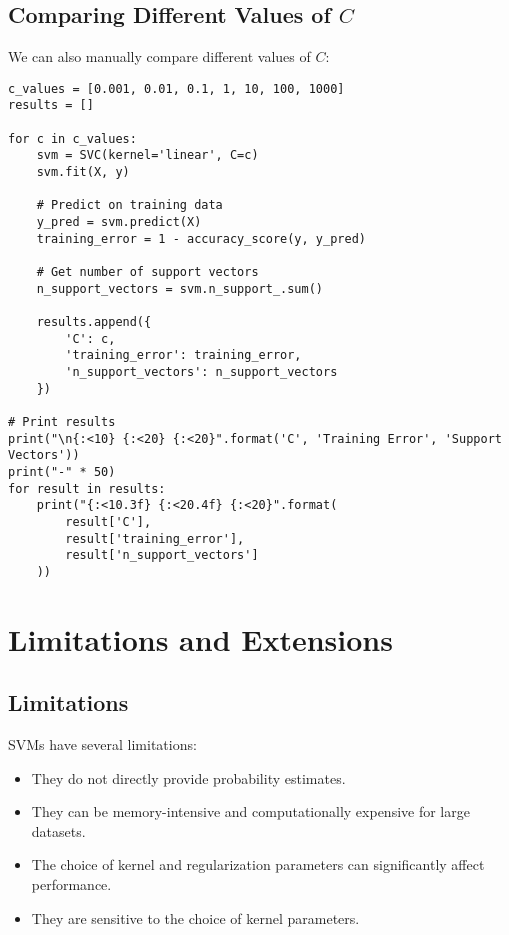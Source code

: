 \documentclass{article}
\begin{document}
\subsection{Comparing Different Values of $C$}

We can also manually compare different values of $C$:

\begin{lstlisting}[caption=Comparing Different Values of C]
c_values = [0.001, 0.01, 0.1, 1, 10, 100, 1000]
results = []

for c in c_values:
    svm = SVC(kernel='linear', C=c)
    svm.fit(X, y)
    
    # Predict on training data
    y_pred = svm.predict(X)
    training_error = 1 - accuracy_score(y, y_pred)
    
    # Get number of support vectors
    n_support_vectors = svm.n_support_.sum()
    
    results.append({
        'C': c,
        'training_error': training_error,
        'n_support_vectors': n_support_vectors
    })

# Print results
print("\n{:<10} {:<20} {:<20}".format('C', 'Training Error', 'Support Vectors'))
print("-" * 50)
for result in results:
    print("{:<10.3f} {:<20.4f} {:<20}".format(
        result['C'],
        result['training_error'],
        result['n_support_vectors']
    ))
\end{lstlisting}

\section{Limitations and Extensions}

\subsection{Limitations}

SVMs have several limitations:
\begin{itemize}
    \item They do not directly provide probability estimates.
    \item They can be memory-intensive and computationally expensive for large datasets.
    \item The choice of kernel and regularization parameters can significantly affect performance.
    \item They are sensitive to the choice of kernel parameters.
\end{itemize}
\end{document}
